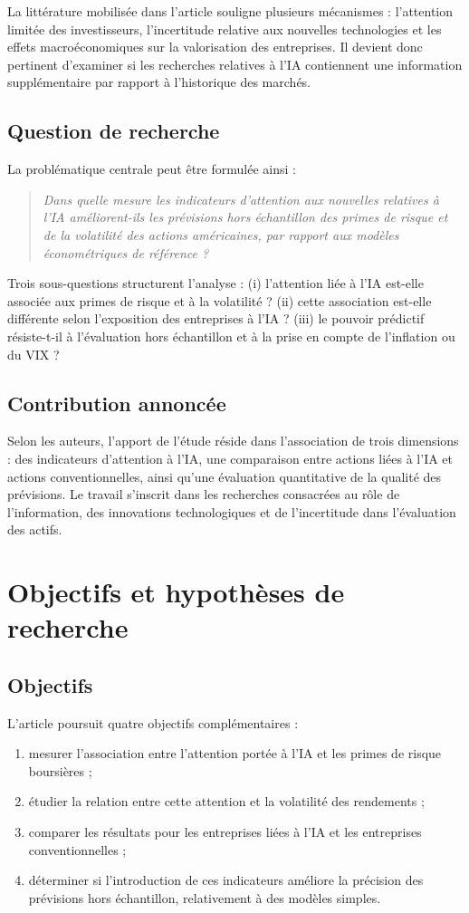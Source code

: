 \documentclass[11pt,a4paper]{article}
\begin{document}
La littérature mobilisée dans l'article souligne plusieurs mécanismes : l'attention limitée des investisseurs, l'incertitude relative aux nouvelles technologies et les effets macroéconomiques sur la valorisation des entreprises. Il devient donc pertinent d'examiner si les recherches relatives à l'IA contiennent une information supplémentaire par rapport à l'historique des marchés.

\subsection{Question de recherche}
La problématique centrale peut être formulée ainsi :
\begin{quote}
\emph{Dans quelle mesure les indicateurs d'attention aux nouvelles relatives à l'IA améliorent-ils les prévisions hors échantillon des primes de risque et de la volatilité des actions américaines, par rapport aux modèles économétriques de référence ?}
\end{quote}
Trois sous-questions structurent l'analyse : (i) l'attention liée à l'IA est-elle associée aux primes de risque et à la volatilité ? (ii) cette association est-elle différente selon l'exposition des entreprises à l'IA ? (iii) le pouvoir prédictif résiste-t-il à l'évaluation hors échantillon et à la prise en compte de l'inflation ou du VIX ?

\subsection{Contribution annoncée}
Selon les auteurs, l'apport de l'étude réside dans l'association de trois dimensions : des indicateurs d'attention à l'IA, une comparaison entre actions liées à l'IA et actions conventionnelles, ainsi qu'une évaluation quantitative de la qualité des prévisions. Le travail s'inscrit dans les recherches consacrées au rôle de l'information, des innovations technologiques et de l'incertitude dans l'évaluation des actifs.

\section{Objectifs et hypothèses de recherche}
\subsection{Objectifs}
L'article poursuit quatre objectifs complémentaires :
\begin{enumerate}
\item mesurer l'association entre l'attention portée à l'IA et les primes de risque boursières ;
\item étudier la relation entre cette attention et la volatilité des rendements ;
\item comparer les résultats pour les entreprises liées à l'IA et les entreprises conventionnelles ;
\item déterminer si l'introduction de ces indicateurs améliore la précision des prévisions hors échantillon, relativement à des modèles simples.
\end{enumerate}
\end{document}
